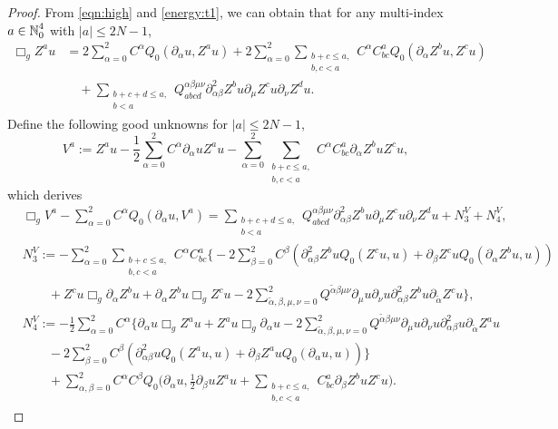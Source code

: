 \documentclass[11pt,twoside]{article}
\def\N{\mathop{\mathbb N\kern 0pt}\nolimits}
\def\p{\partial}
\theoremstyle{plain}
\theoremstyle{definition}
\numberwithin{equation}{section}
\begin{document}
\begin{proof}
From \eqref{eqn:high} and \eqref{energy:t1}, we can obtain that for any multi-index $a\in\N_0^4$ with $|a|\le2N-1$,
\begin{equation}\label{energyA1}
\begin{split}
\Box_gZ^au&=2\sum_{\alpha=0}^2C^{\alpha}Q_0(\p_{\alpha}u,Z^au)
+2\sum_{\alpha=0}^2\sum_{\substack{b+c\le a,\\b,c<a}}C^{\alpha}C^a_{bc}Q_0(\p_{\alpha}Z^bu,Z^cu)\\
&\quad+\sum_{\substack{b+c+d\le a,\\b<a}}Q_{abcd}^{\alpha\beta\mu\nu}\p^2_{\alpha\beta}Z^bu\p_{\mu}Z^cu\p_{\nu}Z^du.
\end{split}
\end{equation}
Define the following good unknowns for $|a|\le2N-1$,
\begin{equation}\label{energyA2}
V^a:=Z^au-\frac12\sum_{\alpha=0}^2C^{\alpha}\p_{\alpha}uZ^au
-\sum_{\alpha=0}^2\sum_{\substack{b+c\le a,\\b,c<a}}C^{\alpha}C^a_{bc}\p_{\alpha}Z^buZ^cu,
\end{equation}
which derives
\begin{equation}\label{energyA3}
\begin{split}
&\Box_gV^a-\sum_{\alpha=0}^2C^{\alpha}Q_0(\p_{\alpha}u,V^a)
=\sum_{\substack{b+c+d\le a,\\b<a}}Q_{abcd}^{\alpha\beta\mu\nu}\p^2_{\alpha\beta}Z^bu\p_{\mu}Z^cu\p_{\nu}Z^du+N^V_3+N^V_4,\\
&N^V_3:=-\sum_{\alpha=0}^2\sum_{\substack{b+c\le a,\\b,c<a}}C^{\alpha}C^a_{bc}\Big\{
-2\sum_{\beta=0}^2C^{\beta}(\p^2_{\alpha\beta}Z^buQ_0(Z^cu,u)+\p_{\beta}Z^cuQ_0(\p_{\alpha}Z^bu,u))\\
&\qquad +Z^cu\Box_g\p_{\alpha}Z^bu+\p_{\alpha}Z^bu\Box_g Z^cu
-2\sum_{\tilde\alpha,\beta,\mu,\nu=0}^2Q^{\tilde\alpha\beta\mu\nu}\p_{\mu}u\p_{\nu}u\p^2_{\alpha\beta}Z^bu\p_{\tilde\alpha}Z^cu\Big\},\\
&N^V_4:=-\frac12\sum_{\alpha=0}^2C^{\alpha}\Big\{\p_{\alpha}u\Box_gZ^au+Z^au\Box_g\p_{\alpha}u
-2\sum_{\tilde\alpha,\beta,\mu,\nu=0}^2Q^{\tilde\alpha\beta\mu\nu}\p_{\mu}u\p_{\nu}u\p^2_{\alpha\beta}u\p_{\tilde\alpha}Z^au\\
&\qquad-2\sum_{\beta=0}^2C^{\beta}(\p^2_{\alpha\beta}uQ_0(Z^au,u)+\p_{\beta}Z^auQ_0(\p_{\alpha}u,u))\Big\}\\
&\qquad +\sum_{\alpha,\beta=0}^2C^{\alpha}C^{\beta}Q_0\Big(\p_{\alpha}u,\frac12\p_{\beta}uZ^au
+\sum_{\substack{b+c\le a,\\b,c<a}}C^a_{bc}\p_{\beta}Z^buZ^cu\Big).

\end{split}
\end{equation}
\end{proof}
\end{document}
